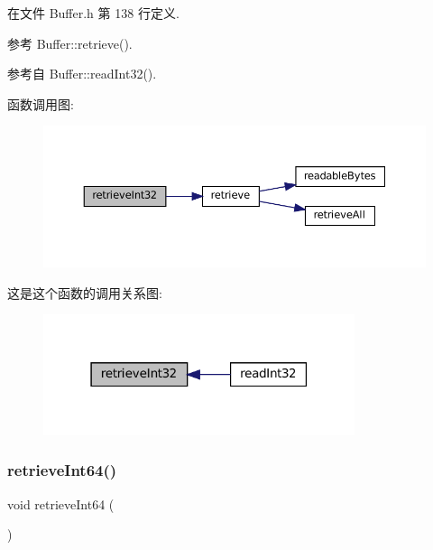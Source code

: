 在文件 Buffer.\+h 第 138 行定义.



参考 Buffer\+::retrieve().



参考自 Buffer\+::read\+Int32().

函数调用图\+:
\nopagebreak
\begin{figure}[H]
\begin{center}
\leavevmode
\includegraphics[width=350pt]{classmuduo_1_1net_1_1Buffer_a703d91e23ca1b8ab42350d8a9aa67de1_cgraph}
\end{center}
\end{figure}
这是这个函数的调用关系图\+:
\nopagebreak
\begin{figure}[H]
\begin{center}
\leavevmode
\includegraphics[width=259pt]{classmuduo_1_1net_1_1Buffer_a703d91e23ca1b8ab42350d8a9aa67de1_icgraph}
\end{center}
\end{figure}
\mbox{\label{classmuduo_1_1net_1_1Buffer_a31eaec053434837ca42b6abc4319f0ee}} 
\subsubsection{\texorpdfstring{retrieve\+Int64()}{retrieveInt64()}}
{\footnotesize\ttfamily void retrieve\+Int64 (\begin{DoxyParamCaption}{ }\end{DoxyParamCaption})\hspace{0.3cm}{\ttfamily [inline]}}




